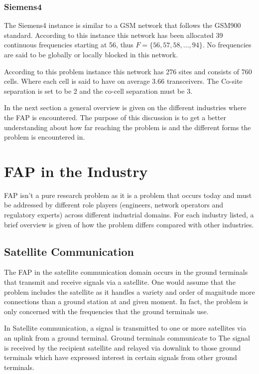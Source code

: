 \subsubsection{Siemens4}
The Siemens4 instance is similar to a GSM network that follows the GSM900 standard. According to this instance this network has been allocated 39 continuous frequencies starting at 56, thus $F = \{56,57,58,\dots,94\}$. No frequencies are said to be globally or locally blocked in this network.

According to this problem instance this network has 276 sites and consists of 760 cells. Where each cell is said to have on average 3.66 transceivers. The Co-site separation is set to be 2 and the co-cell separation must be 3.

In the next section a general overview is given on the different industries where the FAP is encountered. The purpose of this discussion is to get a better understanding about how far reaching the problem is and the different forms the problem is encountered in.
\section{FAP in the Industry}
\label{sec:FAPIndustry}
FAP isn't a pure research problem as it is a problem that occurs today and must be addressed by different role players (engineers, network operators and regulatory experts) across different industrial domains. For each industry listed, a brief overview is given of how the problem differs compared with other industries. 

\subsection{Satellite Communication}
The FAP in the satellite communication domain occurs in the ground terminals that transmit and receive signals via a satellite\cite{Karen2004}. One would assume that the problem includes the satellite as it handles a variety and order of magnitude more connections than a ground station at and given moment. In fact, the problem is only concerned with the frequencies that the ground terminals use\cite{Karen2004}.

In Satellite communication, a signal is transmitted to one or more satellites via an uplink from a ground terminal\cite{Karen2004}. Ground terminals communicate to  The signal is received by the recipient satellite and relayed via downlink to those ground terminals which have expressed interest in certain signals from other ground terminals\cite{Karen2004}.


